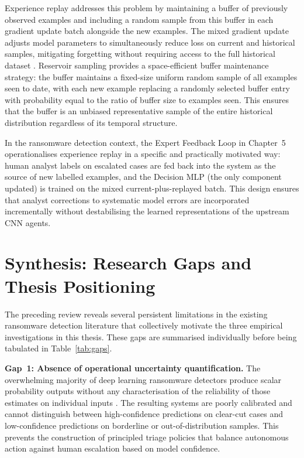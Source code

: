 Experience replay addresses this problem by maintaining a buffer of previously observed
examples and including a random sample from this buffer in each gradient update batch alongside
the new examples.
The mixed gradient update adjusts model parameters to simultaneously reduce loss on current
and historical samples, mitigating forgetting without requiring access to the full historical
dataset \cite{rolnick2019experience}.
Reservoir sampling \cite{vitter1985random} provides a space-efficient buffer maintenance
strategy: the buffer maintains a fixed-size uniform random sample of all examples seen to
date, with each new example replacing a randomly selected buffer entry with probability equal
to the ratio of buffer size to examples seen.
This ensures that the buffer is an unbiased representative sample of the entire historical
distribution regardless of its temporal structure.

In the ransomware detection context, the Expert Feedback Loop in Chapter~5 operationalises
experience replay in a specific and practically motivated way: human analyst labels on
escalated cases are fed back into the system as the source of new labelled examples, and the
Decision MLP (the only component updated) is trained on the mixed current-plus-replayed
batch.
This design ensures that analyst corrections to systematic model errors are incorporated
incrementally without destabilising the learned representations of the upstream CNN agents.

\section{Synthesis: Research Gaps and Thesis Positioning}
\label{sec:lit_gaps}

The preceding review reveals several persistent limitations in the existing ransomware
detection literature that collectively motivate the three empirical investigations in this
thesis.
These gaps are summarised individually before being tabulated in Table~\ref{tab:gaps}.

\textbf{Gap~1: Absence of operational uncertainty quantification.}
The overwhelming majority of deep learning ransomware detectors produce scalar probability
outputs without any characterisation of the reliability of those estimates on individual
inputs \cite{gawlikowski2023Uncertainity, zahoora2022Deep}.
The resulting systems are poorly calibrated and cannot distinguish between high-confidence
predictions on clear-cut cases and low-confidence predictions on borderline or
out-of-distribution samples.
This prevents the construction of principled triage policies that balance autonomous action
against human escalation based on model confidence.

